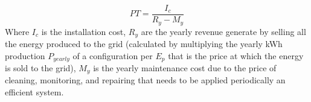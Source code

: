 $$PT=\frac{I_c}{{R_y}-{M_y}}$$
Where $I_c$ is the installation cost, $R_y$ are the yearly revenue generate by selling all the energy produced to the grid (calculated by multiplying the yearly kWh production $P_{yearly}$ of a configuration per $E_p$ that is the price at which the energy is sold to the grid), $M_y$ is the yearly maintenance cost due to the price of cleaning, monitoring, and repairing that needs to be applied periodically an efficient system.




